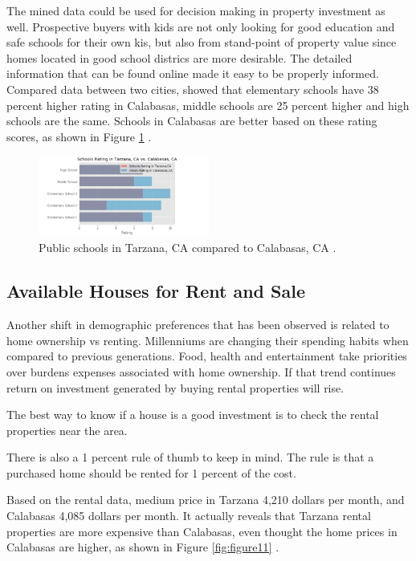 \documentclass[sigconf]{acmart}
\begin{document}
The mined data could be used for decision making in property investment as well. Prospective buyers with kids are not only looking for good education and safe schools for their own kis, but also from stand-point of property value since homes located in good school districs are more desirable. The detailed information that can be found online made it easy to be properly informed. 
Compared data between two cities, showed that elementary schools have 38 percent higher rating in Calabasas, middle schools are 25 percent higher and high schools are the same. 
Schools in Calabasas are better based on these rating scores, as shown in Figure \ref{fig:figure10} \cite{md}.

\begin{figure}
  \centering
  \includegraphics[width=0.5\textwidth]{images/figure10.png}
  \caption{Public schools in Tarzana, CA compared to Calabasas, CA \cite{md}.} \label{fig:figure10} 
\end{figure}

\subsection{Available Houses for Rent and Sale}

Another shift in demographic preferences that has been observed is related to home ownership vs renting.  Millenniums are changing their spending habits when compared to previous generations. Food, health and entertainment take priorities over burdens expenses associated with home ownership.  If that trend continues return on investment generated by buying rental properties will rise.

The best way to know if a house is a good investment is to check the rental properties near the area.

There is also a 1 percent rule of thumb to keep in mind. The rule is that a purchased home should be rented for 1 percent of the cost.

Based on the rental data, medium price in Tarzana 4,210 dollars per month, and Calabasas 4,085 dollars per month. It actually reveals that Tarzana rental properties are more expensive than Calabasas, even thought the home prices in Calabasas are higher, as shown in Figure \ref{fig:figure11} \cite{md}.
\end{document}
